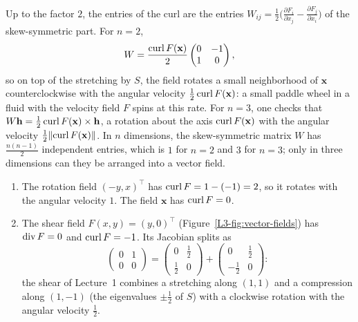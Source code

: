 Up to the factor $2$, the entries of the curl are the entries $W_{ij} = \frac{1}{2}\big(\frac{\partial F_i}{\partial x_j} - \frac{\partial F_j}{\partial x_i}\big)$ of the skew-symmetric part. For $n = 2$,
\[W = \frac{\operatorname{curl} F(\mathbf{x})}{2}\begin{pmatrix} 0 & -1 \\ 1 & 0 \end{pmatrix},\]
so on top of the stretching by $S$, the field rotates a small neighborhood of $\mathbf{x}$ counterclockwise with the angular velocity $\frac{1}{2}\operatorname{curl} F(\mathbf{x})$: a small paddle wheel in a fluid with the velocity field $F$ spins at this rate. For $n = 3$, one checks that $W\mathbf{h} = \frac{1}{2}\operatorname{curl} F(\mathbf{x}) \times \mathbf{h}$, a rotation about the axis $\operatorname{curl} F(\mathbf{x})$ with the angular velocity $\frac{1}{2}\lVert \operatorname{curl} F(\mathbf{x}) \rVert$. In $n$ dimensions, the skew-symmetric matrix $W$ has $\frac{n(n - 1)}{2}$ independent entries, which is $1$ for $n = 2$ and $3$ for $n = 3$; only in three dimensions can they be arranged into a vector field.

\begin{example}\label{L3-ex:curl}
    \begin{enumerate}
        \item The rotation field $(-y, x)^\top$ has $\operatorname{curl} F = 1 - (-1) = 2$, so it rotates with the angular velocity $1$. The field $\mathbf{x}$ has $\operatorname{curl} F = 0$.
        \item The shear field $F(x, y) = (y, 0)^\top$ (Figure~\ref{L3-fig:vector-fields}) has $\operatorname{div} F = 0$ and $\operatorname{curl} F = -1$. Its Jacobian splits as
        \[\begin{pmatrix} 0 & 1 \\ 0 & 0 \end{pmatrix} = \begin{pmatrix} 0 & \frac{1}{2} \\ \frac{1}{2} & 0 \end{pmatrix} + \begin{pmatrix} 0 & \frac{1}{2} \\ -\frac{1}{2} & 0 \end{pmatrix}:\]
        the shear of Lecture~1 combines a stretching along $(1, 1)$ and a compression along $(1, -1)$ (the eigenvalues $\pm\frac{1}{2}$ of $S$) with a clockwise rotation with the angular velocity $\frac{1}{2}$.
    \end{enumerate}
\end{example}

